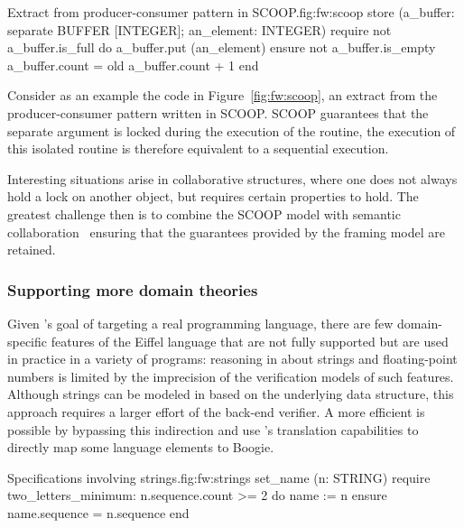 \begin{efigure}[!ht]{Extract from producer-consumer pattern in SCOOP.}{fig:fw:scoop}
store (a_buffer: separate BUFFER [INTEGER]; an_element: INTEGER)
	require
		not a_buffer.is_full
	do
		a_buffer.put (an_element)
	ensure
		not a_buffer.is_empty
		a_buffer.count = old a_buffer.count + 1
	end
\end{efigure}

Consider as an example the code in Figure~\ref{fig:fw:scoop}, an extract from the producer-consumer pattern written in SCOOP.
SCOOP guarantees that the separate argument is locked during the execution of the routine, the execution of this isolated routine is therefore equivalent to a sequential execution.

Interesting situations arise in collaborative structures, where one does not always hold a lock on another object, but requires certain properties to hold.
The greatest challenge then is to combine the SCOOP model with semantic collaboration~\cite{POLIKARPOVA14} ensuring that the guarantees provided by the framing model are retained.




\subsubsection{Supporting more domain theories}

Given \AutoProof's goal of targeting a real programming language, there are few domain-specific features of the Eiffel language that are not fully supported but are used in practice in a variety of programs: reasoning in \AutoProof about strings and floating-point numbers is limited by the imprecision of the verification models of such features.
Although strings can be modeled in \AutoProof based on the underlying data structure, this approach requires a larger effort of the back-end verifier.
A more efficient is possible by bypassing this indirection and use \AutoProof's translation capabilities to directly map some language elements to Boogie.

\begin{efigure}[!ht]{Specifications involving strings.}{fig:fw:strings}
set_name (n: STRING)
	require
		two_letters_minimum: n.sequence.count >= 2
	do
		name := n
	ensure
		name.sequence = n.sequence
	end
\end{efigure}

